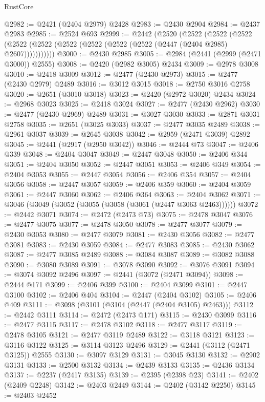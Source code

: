\begin{lexlean}{RustCore}
\begin{coremodule}
@2982 := @2421 (@2404 @2979) @2428
@2983 := @2430 @2904
@2984 := @2437 @2983
@2985 := @2524 @693
@2999 := @2442
    (@2520
      (@2522
        (@2522
          (@2522 (@2522 (@2522 (@2522 (@2522 (@2522 (@2522 (@2447 (@2404 @2985) @2607)))))))))))
@3000 := @2430 @2985
@3005 := @2984 (@2441 (@2999 (@2471 @3000)) @2555)
@3008 := @2420 (@2982 @3005) @2434
@3009 := @2978 @3008
@3010 := @2418 @3009
@3012 := @2477 (@2430 @2973)
@3015 := @2477 (@2430 @2979) @2489
@3016 := @3012 @3015
@3018 := @2750 @3016 @2758
@3020 := @2651 (@3010 @3018)
@3023 := @2420 (@2972 @3020) @2434
@3024 := @2968 @3023
@3025 := @2418 @3024
@3027 := @2477 (@2430 @2962)
@3030 := @2477 (@2430 @2969) @2489
@3031 := @3027 @3030
@3033 := @2871 @3031 @2758
@3035 := @2651 (@3025 @3033)
@3037 := @2477 @3035 @2489
@3038 := @2961 @3037
@3039 := @2645 @3038
@3042 := @2959 (@2471 @3039) @2892
@3045 := @2441 (@2917 (@2950 @3042))
@3046 := @2444 @73
@3047 := @2406 @339
@3048 := @2404 @3047
@3049 := @2447 @3048
@3050 := @2406 @344
@3051 := @2404 @3050
@3052 := @2447 @3051
@3053 := @2406 @349
@3054 := @2404 @3053
@3055 := @2447 @3054
@3056 := @2406 @354
@3057 := @2404 @3056
@3058 := @2447 @3057
@3059 := @2406 @359
@3060 := @2404 @3059
@3061 := @2447 @3060
@3062 := @2406 @364
@3063 := @2404 @3062
@3071 := @3046 (@3049 (@3052 (@3055 (@3058 (@3061 (@2447 @3063 @2463))))))
@3072 := @2442 @3071
@3074 := @2472 (@2473 @73)
@3075 := @2478 @3047
@3076 := @2477 @3075
@3077 := @2478 @3050
@3078 := @2477 @3077
@3079 := @2430 @3053
@3080 := @2477 @3079
@3081 := @2430 @3056
@3082 := @2477 @3081
@3083 := @2430 @3059
@3084 := @2477 @3083
@3085 := @2430 @3062
@3087 := @2477 @3085 @2489
@3088 := @3084 @3087
@3089 := @3082 @3088
@3090 := @3080 @3089
@3091 := @3078 @3090
@3092 := @3076 @3091
@3094 := @3074 @3092 @2496
@3097 := @2441 (@3072 (@2471 @3094))
@3098 := @2444 @171
@3099 := @2406 @399
@3100 := @2404 @3099
@3101 := @2447 @3100
@3102 := @2406 @404
@3104 := @2447 (@2404 @3102)
@3105 := @2406 @409
@3111 := @3098 (@3101 (@3104 (@2447 (@2404 @3105) @2463)))
@3112 := @2442 @3111
@3114 := @2472 (@2473 @171)
@3115 := @2430 @3099
@3116 := @2477 @3115
@3117 := @2478 @3102
@3118 := @2477 @3117
@3119 := @2478 @3105
@3121 := @2477 @3119 @2489
@3122 := @3118 @3121
@3123 := @3116 @3122
@3125 := @3114 @3123 @2496
@3129 := @2441 (@3112 (@2471 @3125)) @2555
@3130 := @3097 @3129
@3131 := @3045 @3130
@3132 := @2902 @3131
@3133 := @2500 @3132
@3134 := @2439 @3133
@3135 := @2436 @3134
@3137 := @2237 (@2417 @3135)
@3139 := @2395 (@2398 @23)
@3141 := @2402 (@2409 @2248)
@3142 := @2403 @2449
@3144 := @2402 (@3142 @2250)
@3145 := @2403 @2452

\end{coremodule}
\end{lexlean}
